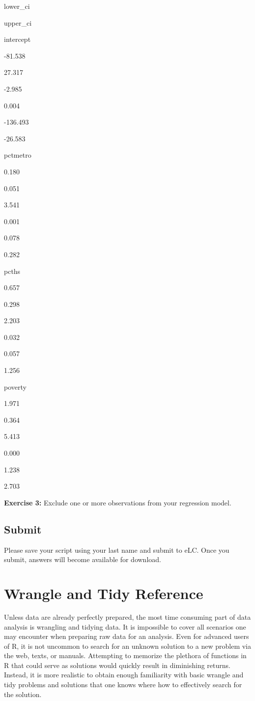 \documentclass[
]{book}
\newenvironment{learncheck}%
{%
  \par\vspace{\baselineskip}\noindent 
  \color{Exercise}\begin{itshape}%
  \par\vspace{\baselineskip}\noindent\ignorespaces 
}%
{%
  \end{itshape}\ignorespacesafterend 
}
\begin{document}
lower\_ci

upper\_ci

intercept

-81.538

27.317

-2.985

0.004

-136.493

-26.583

pctmetro

0.180

0.051

3.541

0.001

0.078

0.282

pcths

0.657

0.298

2.203

0.032

0.057

1.256

poverty

1.971

0.364

5.413

0.000

1.238

2.703

\begin{learncheck}
\textbf{Exercise 3:} Exclude one or more observations from your
regression model.
\end{learncheck}

\hypertarget{submit}{%
\section{Submit}\label{submit}}

Please save your script using your last name and submit to eLC. Once you submit, answers will become available for download.

\hypertarget{appendix-appendix}{%
\appendix}


\hypertarget{wrangle-and-tidy-reference}{%
\chapter{Wrangle and Tidy Reference}\label{wrangle-and-tidy-reference}}

Unless data are already perfectly prepared, the most time consuming part of data analysis is wrangling and tidying data. It is impossible to cover all scenarios one may encounter when preparing raw data for an analysis. Even for advanced users of R, it is not uncommon to search for an unknown solution to a new problem via the web, texts, or manuals. Attempting to memorize the plethora of functions in R that could serve as solutions would quickly result in diminishing returns. Instead, it is more realistic to obtain enough familiarity with basic wrangle and tidy problems and solutions that one knows where how to effectively search for the solution.
\end{document}
